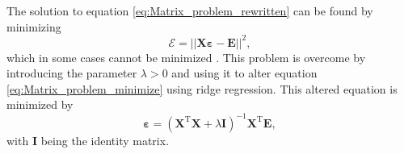 The solution to equation \eqref{eq:Matrix_problem_rewritten} can be found by minimizing
\begin{equation}
	\mathcal{E} = ||\mathbf{X}\bm{\varepsilon} - \mathbf{E}||^2,
	\label{eq:Matrix_problem_minimize}
\end{equation}
which in some cases cannot be minimized \cite{Meldgaard}. This problem is overcome by introducing the parameter $\lambda > 0$ and using it to alter equation \eqref{eq:Matrix_problem_minimize} using ridge regression. This altered equation is minimized by \cite{Meldgaard}
\begin{equation}
	\bm{\varepsilon} = (\mathbf{X}^\text{T}\mathbf{X} + \lambda\mathbf{I})^{-1} \mathbf{X}^\text{T} \mathbf{E},
\end{equation}
 with $\mathbf{I}$ being the identity matrix.
 
 \clearpage

